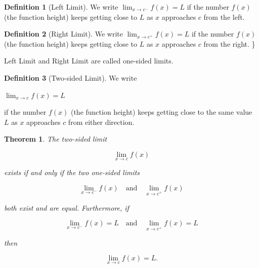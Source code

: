 \documentclass[
]{book}
\newtheorem{theorem}{Theorem}[chapter]
\theoremstyle{definition}
\newtheorem{definition}{Definition}[chapter]
\theoremstyle{definition}
\theoremstyle{definition}
\theoremstyle{definition}
\theoremstyle{remark}
\begin{document}
\begin{definition}[Left Limit]
\protect\hypertarget{def:unnamed-chunk-9}{}\label{def:unnamed-chunk-9}We write \(\lim_{{x \to c^-}} f(x) = L\) if the number \(f(x)\) (the function height) keeps getting close to \(L\) as \(x\) approaches \(c\) from the left.
\end{definition}

\begin{definition}[Right Limit]
\protect\hypertarget{def:unnamed-chunk-10}{}\label{def:unnamed-chunk-10}We write \(\lim_{{x \to c^+}} f(x) = L\) if the number \(f(x)\) (the function height) keeps getting close to \(L\) as \(x\) approaches \(c\) from the right.
\}

Left Limit and Right Limit are called one-sided limits.
\end{definition}

\begin{definition}[Two-sided Limit]
\protect\hypertarget{def:unnamed-chunk-11}{}\label{def:unnamed-chunk-11}We write

\(\lim_{{x \to c}} f(x) = L\)

if the number \(f(x)\) (the function height) keeps getting close to the
same value \(L\) as \(x\) approaches \(c\) from either direction.
\end{definition}

\begin{theorem}
\protect\hypertarget{thm:unnamed-chunk-12}{}\label{thm:unnamed-chunk-12}The two-sided limit

\[\lim_{{x \to c}} f(x)\]

exists if and only if the two one-sided limits

\[\lim_{{x \to c^-}} f(x) \quad \text{and} \quad \lim_{{x \to c^+}} f(x)\]

both exist and are equal. Furthermore, if

\[\lim_{{x \to c^-}} f(x) = L \quad \text{and} \quad \lim_{{x \to c^+}} f(x) = L\]

then

\[\lim_{{x \to c}} f(x) = L.\]
\end{theorem}
\end{document}
